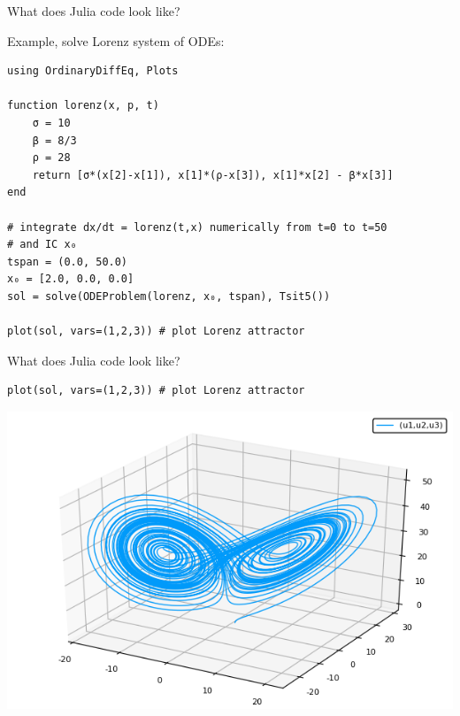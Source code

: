 \documentclass[compress,presentation,aspectratio=169]{beamer}
\begin{document}
\begin{frame}[fragile,label={sec:org6062e64}]{What does Julia code
    look like?}
  \footnotesize
 \begin{block}{Example, solve Lorenz system of ODEs:}
\begin{verbatim}
using OrdinaryDiffEq, Plots

function lorenz(x, p, t)
    σ = 10
    β = 8/3
    ρ = 28
    return [σ*(x[2]-x[1]), x[1]*(ρ-x[3]), x[1]*x[2] - β*x[3]]
end

# integrate dx/dt = lorenz(t,x) numerically from t=0 to t=50
# and IC x₀
tspan = (0.0, 50.0)
x₀ = [2.0, 0.0, 0.0]
sol = solve(ODEProblem(lorenz, x₀, tspan), Tsit5())

plot(sol, vars=(1,2,3)) # plot Lorenz attractor
\end{verbatim}
\end{block}
\end{frame}

\begin{frame}[fragile,label={sec:org613e3fa}]{What does Julia code
    look like?}
    \footnotesize
 \begin{verbatim}
plot(sol, vars=(1,2,3)) # plot Lorenz attractor
\end{verbatim}

\begin{center}
\includegraphics[width=.6\linewidth]{./figs/lorenz.png}
\end{center}
\end{frame}
\end{document}
